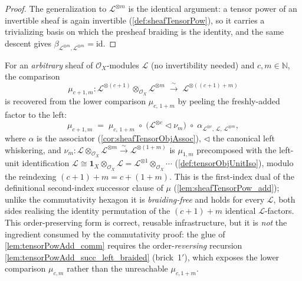 \begin{proof}
  The generalization to \(\mathcal{L}^{\otimes m}\) is the identical argument: a
  tensor power of an invertible sheaf is again invertible
  (\cref{def:sheafTensorPow}), so it carries a trivializing basis on which the
  presheaf braiding is the identity, and the same descent gives
  \(\beta_{\mathcal{L}^{\otimes m},\mathcal{L}^{\otimes m}} = \mathrm{id}\).
\end{proof}

\begin{lemma}

  \label{lem:tensorPowAdd_succ_left}
  For an \emph{arbitrary} sheaf of \(\mathcal{O}_X\)-modules \(\mathcal{L}\) (no
  invertibility needed) and \(c, m \in \mathbb{N}\), the comparison
  \[
    \mu_{c+1,m} : \mathcal{L}^{\otimes(c+1)} \otimes_{\mathcal{O}_X}
      \mathcal{L}^{\otimes m} \;\xrightarrow{\ \sim\ }\;
      \mathcal{L}^{\otimes((c+1)+m)}
  \]
  is recovered from the lower comparison \(\mu_{c,\,1+m}\) by peeling the
  freshly-added factor to the left:
  \[
    \mu_{c+1,m}
      \;=\;
      \mu_{c,\,1+m}
      \;\circ\;
      \bigl(\mathcal{L}^{\otimes c} \lhd \nu_m\bigr)
      \;\circ\;
      \alpha_{\mathcal{L}^{\otimes c},\,\mathcal{L},\,\mathcal{L}^{\otimes m}},
  \]
  where \(\alpha\) is the associator (\cref{cor:sheafTensorObjAssoc}), \(\lhd\)
  the canonical left whiskering, and
  \(\nu_m : \mathcal{L} \otimes_{\mathcal{O}_X} \mathcal{L}^{\otimes m}
  \xrightarrow{\sim} \mathcal{L}^{\otimes(1+m)}\) is \(\mu_{1,m}\) precomposed
  with the left-unit identification \(\mathcal{L} \cong
  \mathbf{1}_X \otimes_{\mathcal{O}_X}\mathcal{L} = \mathcal{L}^{\otimes 1}
  \otimes_{\mathcal{O}_X} \cdots\) (\cref{def:tensorObjUnitIso}), modulo the
  reindexing \((c+1)+m = c+(1+m)\). This is the first-index dual of the
  definitional second-index successor clause of \(\mu\)
  (\cref{lem:sheafTensorPow_add}); unlike the commutativity hexagon it is
  \emph{braiding-free} and holds for every \(\mathcal{L}\), both sides realising
  the identity permutation of the \((c+1)+m\) identical \(\mathcal{L}\)-factors.
  This order-preserving form is correct, reusable infrastructure, but it is
  \emph{not} the ingredient consumed by the commutativity proof: the glue of
  \cref{lem:tensorPowAdd_comm} requires the order-\emph{reversing} recursion
  \cref{lem:tensorPowAdd_succ_left_braided} (brick~1\('\)), which exposes the lower
  comparison \(\mu_{c,m}\) rather than the unreachable \(\mu_{c,1+m}\).
\end{lemma}

